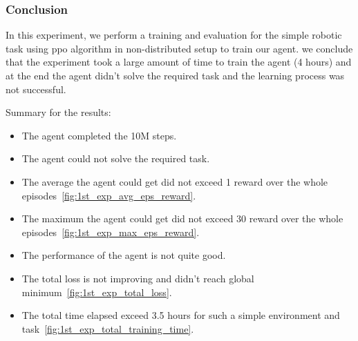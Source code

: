 \subsubsection{Conclusion}

In this experiment, we perform a training and evaluation for the simple robotic task using ppo algorithm in non-distributed setup to train our agent. we conclude that the experiment took a large amount of time to train the agent (4 hours) and at the end the agent didn't solve the required task and the learning process was not successful. 

Summary for the results:
\begin{itemize}
	\item The agent completed the 10M steps.
	\item The agent could not solve the required task.
	\item The average the agent could get did not exceed 1 reward over the whole episodes~\ref{fig:1st_exp_avg_eps_reward}.
	\item The maximum the agent could get did not exceed 30 reward over the whole episodes~\ref{fig:1st_exp_max_eps_reward}.
	\item The performance of the agent is not quite good.
	\item The total loss is not improving and didn't reach global minimum~\ref{fig:1st_exp_total_loss}.
	\item The total time elapsed exceed 3.5 hours for such a simple environment and task~\ref{fig:1st_exp_total_training_time}.
\end{itemize}